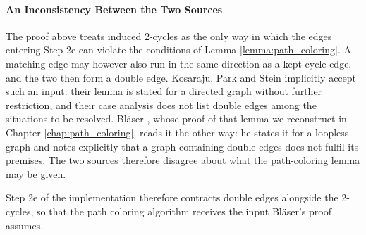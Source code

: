 \paragraph{An Inconsistency Between the Two Sources}
The proof above treats induced 2-cycles as the only way in which the edges
entering Step 2e can violate the conditions of Lemma
\ref{lemma:path_coloring}. A matching edge may however also run in the
same direction as a kept cycle edge, and the two then form a double
edge. Kosaraju, Park and Stein implicitly accept such an input: their lemma is
stated for a directed graph without further restriction, and their case
analysis does not list double edges among the situations to be resolved.
Bl\"aser \cite{Blaser2004}, whose proof of that lemma we reconstruct in
Chapter \ref{chap:path_coloring}, reads it the other way: he states it for a
loopless graph and notes explicitly that a graph containing double edges does
not fulfil its premises. The two sources therefore disagree about what the
path-coloring lemma may be given.

Step 2e of the implementation therefore contracts double edges alongside the
2-cycles, so that the path coloring algorithm receives the input Bl\"aser's proof assumes.

